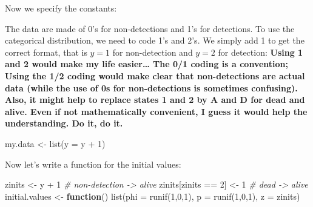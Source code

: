 \documentclass[
  12pt,
]{krantz}
\newenvironment{Shaded}{\begin{snugshade}}{\end{snugshade}}
\newcommand{\AttributeTok}[1]{\textcolor[rgb]{0.77,0.63,0.00}{#1}}
\newcommand{\CommentTok}[1]{\textcolor[rgb]{0.56,0.35,0.01}{\textit{#1}}}
\newcommand{\ControlFlowTok}[1]{\textcolor[rgb]{0.13,0.29,0.53}{\textbf{#1}}}
\newcommand{\DecValTok}[1]{\textcolor[rgb]{0.00,0.00,0.81}{#1}}
\newcommand{\DocumentationTok}[1]{\textcolor[rgb]{0.56,0.35,0.01}{\textbf{\textit{#1}}}}
\newcommand{\FunctionTok}[1]{\textcolor[rgb]{0.00,0.00,0.00}{#1}}
\newcommand{\NormalTok}[1]{#1}
\newcommand{\OtherTok}[1]{\textcolor[rgb]{0.56,0.35,0.01}{#1}}
\newcommand{\SpecialCharTok}[1]{\textcolor[rgb]{0.00,0.00,0.00}{#1}}
\begin{document}
Now we specify the constants:

\begin{Shaded}
\end{Shaded}

The data are made of 0's for non-detections and 1's for detections. To use the categorical distribution, we need to code 1's and 2's. We simply add 1 to get the correct format, that is \(y = 1\) for non-detection and \(y = 2\) for detection: \textbf{Using 1 and 2 would make my life easier\ldots{} The 0/1 coding is a convention; Using the 1/2 coding would make clear that non-detections are actual data (while the use of 0s for non-detections is sometimes confusing). Also, it might help to replace states 1 and 2 by A and D for dead and alive. Even if not mathematically convenient, I guess it would help the understanding. Do it, do it.}

\begin{Shaded}
\begin{Highlighting}[]
\NormalTok{my.data }\OtherTok{\textless{}{-}} \FunctionTok{list}\NormalTok{(}\AttributeTok{y =}\NormalTok{ y }\SpecialCharTok{+} \DecValTok{1}\NormalTok{)}
\end{Highlighting}
\end{Shaded}

Now let's write a function for the initial values:

\begin{Shaded}
\begin{Highlighting}[]
\NormalTok{zinits }\OtherTok{\textless{}{-}}\NormalTok{ y }\SpecialCharTok{+} \DecValTok{1} \CommentTok{\# non{-}detection {-}\textgreater{} alive}
\NormalTok{zinits[zinits }\SpecialCharTok{==} \DecValTok{2}\NormalTok{] }\OtherTok{\textless{}{-}} \DecValTok{1} \CommentTok{\# dead {-}\textgreater{} alive}
\NormalTok{initial.values }\OtherTok{\textless{}{-}} \ControlFlowTok{function}\NormalTok{() }\FunctionTok{list}\NormalTok{(}\AttributeTok{phi =} \FunctionTok{runif}\NormalTok{(}\DecValTok{1}\NormalTok{,}\DecValTok{0}\NormalTok{,}\DecValTok{1}\NormalTok{),}
                                  \AttributeTok{p =} \FunctionTok{runif}\NormalTok{(}\DecValTok{1}\NormalTok{,}\DecValTok{0}\NormalTok{,}\DecValTok{1}\NormalTok{),}
                                  \AttributeTok{z =}\NormalTok{ zinits)}
\end{Highlighting}
\end{Shaded}
\end{document}
